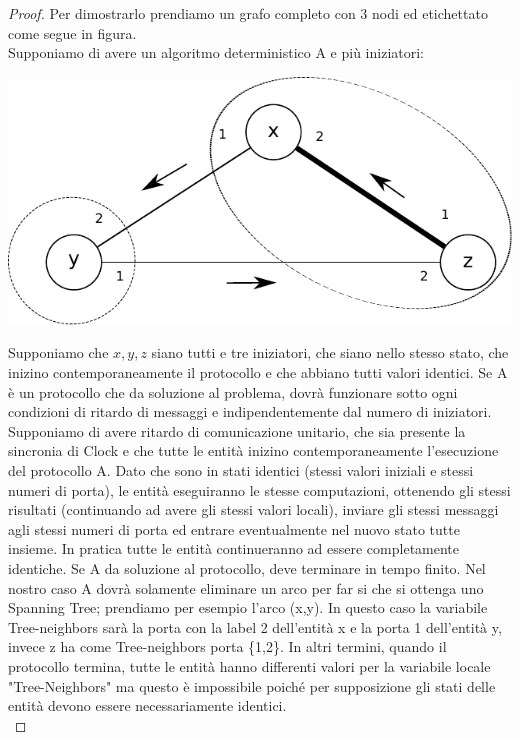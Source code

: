 \begin{proof}
    Per dimostrarlo prendiamo un grafo completo con 3 nodi ed etichettato come
    segue in figura.\\
    Supponiamo di avere un algoritmo deterministico A e più iniziatori:
    \begin{center}
        \includegraphics[scale=0.8]{capitoli/costruzione-spanning-tree/imgs/n_37}
    \end{center}

    Supponiamo che $x, y, z$ siano tutti e tre iniziatori, che siano nello
    stesso stato, che inizino contemporaneamente il protocollo e che abbiano
    tutti valori identici. Se A è un protocollo che da soluzione al problema,
    dovrà funzionare sotto ogni condizioni di ritardo di messaggi e
    indipendentemente dal numero di iniziatori. Supponiamo di avere ritardo di
    comunicazione unitario, che sia presente la sincronia di Clock e che tutte
    le entità inizino contemporaneamente l'esecuzione del protocollo A. Dato che
    sono in stati identici (stessi valori iniziali e stessi numeri di porta), le
    entità eseguiranno le stesse computazioni, ottenendo gli stessi risultati
    (continuando ad avere gli stessi valori locali), inviare gli stessi messaggi
    agli stessi numeri di porta ed entrare eventualmente nel nuovo stato tutte
    insieme. In pratica tutte le entità continueranno ad essere completamente
    identiche. Se A da soluzione al protocollo, deve terminare in tempo finito.
    Nel nostro caso A dovrà solamente eliminare un arco per far si che si
    ottenga uno Spanning Tree; prendiamo per esempio l'arco (x,y). In questo
    caso la variabile Tree-neighbors sarà la porta con la label 2 dell'entità x e
    la porta 1 dell'entità y, invece z ha come Tree-neighbors porta \{1,2\}. In
    altri termini, quando il protocollo termina, tutte le entità hanno
    differenti valori per la variabile locale "Tree-Neighbors" ma questo è
    impossibile poiché per supposizione gli stati delle entità devono essere
    necessariamente identici.\\


\end{proof}

